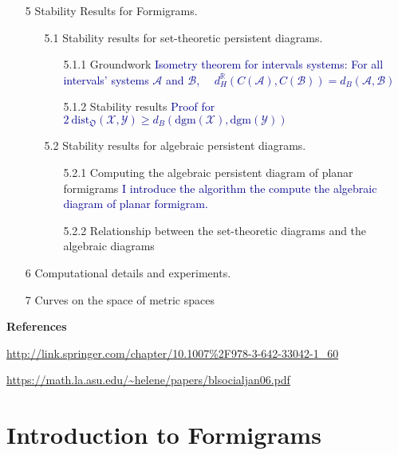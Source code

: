 \documentclass[a4paper,12pt]{article}
\newcommand{\woojin}[1]           {{ \textcolor{darkblue} {#1}}}
\newcommand{\facundo}[1]                {{ \textcolor{darkred} {#1}}}
\newcommand{\dgm}{\mathrm{dgm}}
\begin{document}
\begin{itemize}
\item[5] Stability Results for Formigrams.
\begin{itemize}
\item[5.1] Stability results for set-theoretic persistent diagrams. %
\begin{itemize}
\item[5.1.1] Groundwork \woojin{Isometry theorem for intervals systems: For all intervals' systems $\mathcal{A}$ and $\mathcal{B}$, \ \  $d_H^\mathbb{R}(C(\mathcal{A}),C(\mathcal{B}))=d_B(\mathcal{A},\mathcal{B})$}
\item[5.1.2] Stability results \woojin{Proof for $2\  \mathrm{dist}_{\mathfrak{O}}(\mathcal{X},\mathcal{Y})\geq d_B(\dgm(\mathcal{X}), \dgm(\mathcal{Y}))$}
\end{itemize}

\item[5.2] Stability results for algebraic persistent diagrams.
\begin{itemize}
	\item[5.2.1] Computing the algebraic persistent diagram of planar formigrams \woojin{I introduce the algorithm the compute the algebraic diagram of planar formigram.}
	\item[5.2.2] Relationship between the set-theoretic diagrams and the algebraic diagrams
\end{itemize}



\end{itemize}


\item[6] Computational details and experiments.

\item[7] Curves on the space of metric spaces
\end{itemize}

\medskip

\begin{center}
\textbf{References}
\end{center}

\url{http://link.springer.com/chapter/10.1007%2F978-3-642-33042-1_60}

\url{https://math.la.asu.edu/~helene/papers/blsocialjan06.pdf
}



\newpage

\section{Introduction to Formigrams}
\end{document}
